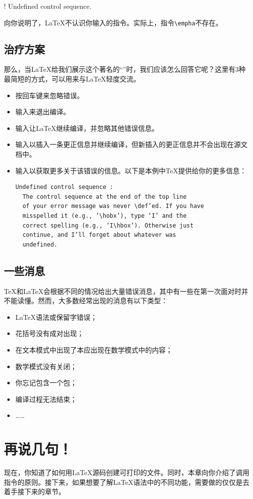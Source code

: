 \begin{dmd}
    ! Undefined control sequence.
\end{dmd}

向你说明了，\LaTeX 不认识你输入的指令。实际上，指令\verb|\empha|不存在。

\subsection*{治疗方案}

那么，当\LaTeX 给我们展示这个著名的“”时，我们应该怎么回答它呢？这里有3种最简短的方式，可以用来与\LaTeX 轻度交流。

\begin{itemize}
    \item 按回车键来忽略错误。
    \item 输入来退出编译。
    \item 输入让\LaTeX 继续编译，并忽略其他错误信息。
    \item 输入以插入一条更正信息并继续编译，但新插入的更正信息并不会出现在源文档中。
    \item 输入以获取更多关于该错误的信息。以下是本例中\TeX 提供给你的更多信息：\begin{verbatim}
Undefined control sequence :
  The control sequence at the end of the top line
  of your error message was never \def’ed. If you have
  misspelled it (e.g., ‘\hobx’), type ‘I’ and the
  correct spelling (e.g., ‘I\hbox’). Otherwise just
  continue, and I’ll forget about whatever was
  undefined.\end{verbatim}
\end{itemize}

\subsection{一些消息}

\TeX 和\LaTeX 会根据不同的情况给出大量错误消息，其中有一些在第一次面对时并不能读懂。然而，大多数经常出现的消息有以下类型：

\begin{itemize}
    \item \LaTeX 语法或保留字错误；
    \item 花括号没有成对出现；
    \item 在文本模式中出现了本应出现在数学模式中的内容；
    \item 数学模式没有关闭；
    \item 你忘记包含一个包；
    \item 编译过程无法结束；%
    \item ……
\end{itemize}

\section{再说几句！}

现在，你知道了如何用\LaTeX 源码创建可打印的文件。同时，本章向你介绍了调用指令的原则。接下来，如果想要了解\LaTeX 语法中的不同功能，需要做的仅仅是去着手接下来的章节。%